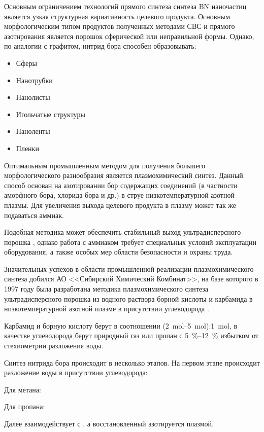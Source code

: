 Основным ограничением технологий прямого синтеза синтеза BN наночастиц является
узкая структурная вариативность целевого продукта. Основным морфологическим типом
продуктов полученных методами СВС и прямого азотирования является порошок сферической
или неправильной формы. Однако, по аналогии с графитом, нитрид бора способен
образовывать:

\begin{itemize}
    \item Сферы 
    \item Нанотрубки
    \item Нанолисты
    \item Игольчатые структуры
    \item Наноленты
    \item Пленки
\end{itemize}

Оптимальным промышленным методом для получения  большего морфологического 
разнообразия является плазмохимический синтез. Данный способ основан на азотировании
бор содержащих соединений (в частности аморфного бора, хлорида бора и др.) в 
струе низкотемпературной азотной плазмы. Для увеличения выхода целевого продукта
в плазму может так же подаваться аммиак.

Подобная методика может обеспечить стабильный выход ультрадисперсного порошка ,
однако работа с аммиаком требует специальных условий эксплуатации оборудования, а также
особых мер области безопасности и охраны труда. 

Значительных успехов в области промышленной реализации плазмохимического синтеза
добился АО <<Сибирский Химический Комбинат>>, на базе которого в 1997 году была 
разработана методика плазмохимического синтеза ультрадисперсного порошка 
из водного раствора борной кислоты и карбамида в низкотемпературной азотной плазме
в присутствии углеводорода \cite[]{__1997}.  

Карбамид и борную кислоту берут в соотношении (\SIrange{2}{5}{\mol}):\SI{1}{\mol},
в качестве углеводорода берут природный газ или пропан с \SIrange{5}{12}{\%} избытком
от стехиометрии разложения воды.

Синтез нитрида бора происходит в несколько этапов. На первом этапе происходит
разложение воды в присутствии углеводорода:

Для метана:

Для пропана:

Далее  взаимодействует с , а восстановленный  азотируется
плазмой.

